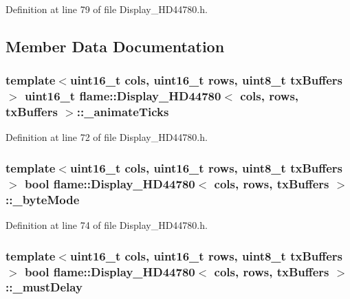 Definition at line 79 of file Display\-\_\-\-H\-D44780.\-h.



\subsection{Member Data Documentation}
\hypertarget{classflame_1_1_display___h_d44780_aa87fd152ce1f1dd679ea6aeae6fdf596}{
\subsubsection[{\-\_\-animate\-Ticks}]{\setlength{\rightskip}{0pt plus 5cm}template$<$uint16\-\_\-t cols, uint16\-\_\-t rows, uint8\-\_\-t tx\-Buffers$>$ uint16\-\_\-t {\bf flame\-::\-Display\-\_\-\-H\-D44780}$<$ cols, rows, tx\-Buffers $>$\-::\-\_\-animate\-Ticks\hspace{0.3cm}{\ttfamily [protected]}}}\label{classflame_1_1_display___h_d44780_aa87fd152ce1f1dd679ea6aeae6fdf596}


Definition at line 72 of file Display\-\_\-\-H\-D44780.\-h.

\hypertarget{classflame_1_1_display___h_d44780_a719e1ad8661a35fbcc440ac4f1492657}{
\subsubsection[{\-\_\-byte\-Mode}]{\setlength{\rightskip}{0pt plus 5cm}template$<$uint16\-\_\-t cols, uint16\-\_\-t rows, uint8\-\_\-t tx\-Buffers$>$ bool {\bf flame\-::\-Display\-\_\-\-H\-D44780}$<$ cols, rows, tx\-Buffers $>$\-::\-\_\-byte\-Mode\hspace{0.3cm}{\ttfamily [protected]}}}\label{classflame_1_1_display___h_d44780_a719e1ad8661a35fbcc440ac4f1492657}


Definition at line 74 of file Display\-\_\-\-H\-D44780.\-h.

\hypertarget{classflame_1_1_display___h_d44780_abd557b0db9b085b5781a760b6660ec81}{
\subsubsection[{\-\_\-must\-Delay}]{\setlength{\rightskip}{0pt plus 5cm}template$<$uint16\-\_\-t cols, uint16\-\_\-t rows, uint8\-\_\-t tx\-Buffers$>$ bool {\bf flame\-::\-Display\-\_\-\-H\-D44780}$<$ cols, rows, tx\-Buffers $>$\-::\-\_\-must\-Delay\hspace{0.3cm}{\ttfamily [protected]}}}\label{classflame_1_1_display___h_d44780_abd557b0db9b085b5781a760b6660ec81}


